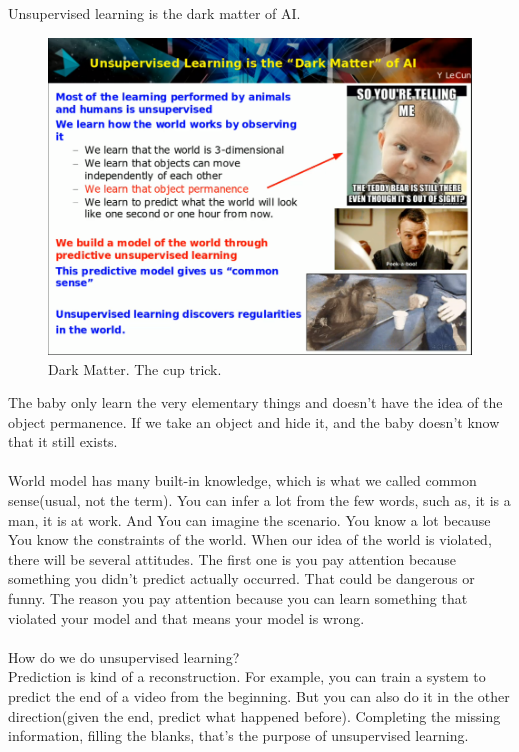 \documentclass{article}
\begin{document}
Unsupervised learning is the dark matter of AI.
\begin{figure}[ht]
\centering
\includegraphics[scale=0.6]{DarkMatter.png}
\caption{Dark Matter. The cup trick.}
\label{fig2:label}
\end{figure}

The baby only learn the very elementary things and doesn't have the idea of the object permanence. If we take an object and hide it, and the baby doesn't know that it still exists. \\ \\

World model has many built-in knowledge, which is what we called common sense(usual, not the term). You can infer a lot from the few words, such as, it is a man, it is at work. And You can imagine the scenario. You know a lot because You know the constraints of the world. When our idea of the world is violated, there will be several attitudes. The first one is you pay attention because something you didn't predict actually occurred. That could be dangerous or funny. The reason you pay attention because you can learn something that violated your model and that means your model is wrong.\\ \\

How do we do unsupervised learning? \\ 
Prediction is kind of a reconstruction. For example, you can train a system to predict the end of a video from the beginning. But you can also do it in the other direction(given the end, predict what happened before). Completing the missing information, filling the blanks, that's the purpose of unsupervised learning.\\ \\
\end{document}
